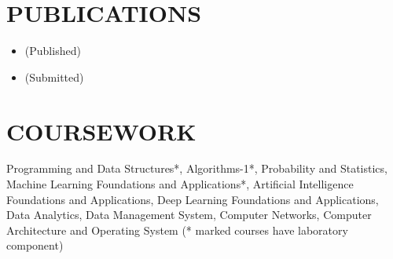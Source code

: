 \documentclass[a4paper,9pt]{extarticle}
\begin{document}

\vspace{-0.4cm}
\section*{PUBLICATIONS}
\vspace{-0.3cm}
\noindent
\begin{itemize}
    \item {} (Published)
\end{itemize}
\vspace{-0.3cm}
\begin{itemize}
    \item {} (Submitted)
\end{itemize}

\vspace{-0.4cm}
\section*{COURSEWORK}
    \vspace{-0.2cm}
    Programming and Data Structures*, Algorithms-1*, Probability and Statistics, Machine Learning Foundations and Applications*, Artificial Intelligence Foundations and Applications, Deep Learning Foundations and Applications, Data Analytics, Data Management System, Computer Networks, Computer Architecture and Operating System (* marked courses have laboratory component)
\end{document}
